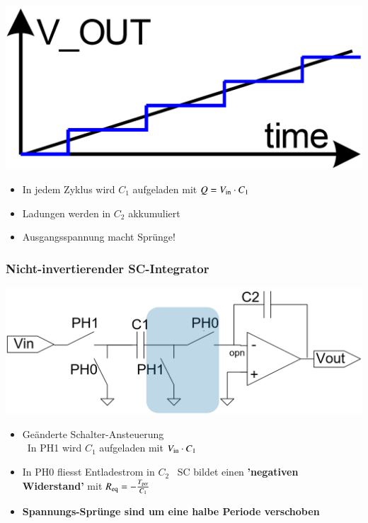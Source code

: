 \begin{minipage}[c]{0.25\columnwidth}
    \includegraphics[width=\columnwidth]{images/sc_integrator_verlauf.png}
\end{minipage}
\hfill
\begin{minipage}[c]{0.72\columnwidth}
    \begin{itemize}
        \item In jedem Zyklus wird $C_1$ aufgeladen mit $Q = V_{\rm in} \cdot C_1$
        \item Ladungen werden in $C_2$ akkumuliert
        \item Ausgangsspannung macht Sprünge!
    \end{itemize}
\end{minipage}


\subsubsection{Nicht-invertierender SC-Integrator}

\begin{minipage}[c]{0.4\columnwidth}
    \includegraphics[width=\columnwidth]{images/nicht-invertierender_sc_integrator.png}
\end{minipage}
\hfill
\begin{minipage}[c]{0.58\columnwidth}
    \begin{itemize}
        \item Geänderte Schalter-Ansteuerung \\
            \textrightarrow\ In PH1 wird $C_1$ aufgeladen mit $V_{\rm in} \cdot C_1$
        \item In PH0 fliesst Entladestrom in $C_2$ \textrightarrow\ SC bildet einen \textbf{'negativen Widerstand'} 
            mit $R_{\rm eq} = - \frac{T_{\rm per}}{C_1}$ 
        \item \textbf{Spannungs-Sprünge sind um eine halbe Periode verschoben} 
    \end{itemize}
\end{minipage}


